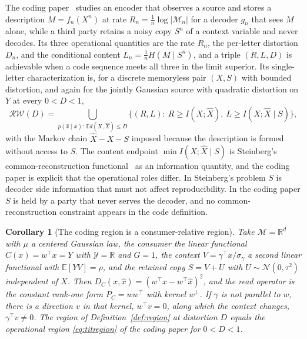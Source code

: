 \documentclass[11pt]{article}
\newtheorem{corollary}{Corollary}
\theoremstyle{definition}
\theoremstyle{remark}
\newcommand{\PC}{P_{C}}
\newcommand{\M}{\mathcal{M}}
\newcommand{\Y}{\mathcal{Y}}
\newcommand{\E}{\mathbb{E}}
\newcommand{\R}{\mathbb{R}}
\begin{document}
The coding paper~\cite{bond2026tit} studies an encoder that observes a source and stores a description $M=f_{n}(X^{n})$ at rate $R_{n}=\tfrac1n\log|\mathcal{M}_{n}|$ for a decoder $g_{n}$ that sees $M$ alone, while a third party retains a noisy copy $S^{n}$ of a context variable and never decodes.
Its three operational quantities are the rate $R_{n}$, the per-letter distortion $D_{n}$, and the conditional content $L_{n}=\tfrac1n H(M\mid S^{n})$, and a triple $(R,L,D)$ is achievable when a code sequence meets all three in the limit superior.
Its single-letter characterization is, for a discrete memoryless pair $(X,S)$ with bounded distortion, and again for the jointly Gaussian source with quadratic distortion on $Y$ at every $0<D<1$,
\begin{equation}
\mathcal{RW}(D)=\bigcup_{p(\hat{x}\mid x):\,\E d(X,\hat{X})\le D}\bigl\{(R,L):\ R\ge I(X;\hat{X}),\ L\ge I(X;\hat{X}\mid S)\bigr\},
\label{eq:titregion}
\end{equation}
with the Markov chain $\hat{X}-X-S$ imposed because the description is formed without access to $S$.
The content endpoint $\min I(X;\hat{X}\mid S)$ is Steinberg's common-reconstruction functional~\cite{steinberg2009} as an information quantity, and the coding paper is explicit that the operational roles differ. In Steinberg's problem $S$ is decoder side information that must not affect reproducibility. In the coding paper $S$ is held by a party that never serves the decoder, and no common-reconstruction constraint appears in the code definition.

\begin{corollary}[The coding region is a consumer-relative region]
\label{cor:coding}
Take $\M=\R^{d}$ with $\mu$ a centered Gaussian law, the consumer the linear functional $C(x)=w^{\top}x=Y$ with $\Y=\R$ and $G=1$, the context $V=\gamma^{\top}x/\sigma_{\gamma}$ a second linear functional with $\E[YV]=\rho$, and the retained copy $S=V+U$ with $U\sim\mathcal{N}(0,\tau^{2})$ independent of $X$. Then $D_{C}(x,\hat{x})=(w^{\top}x-w^{\top}\hat{x})^{2}$, and the read operator is the constant rank-one form $\PC=ww^{\top}$ with kernel $w^{\perp}$. If $\gamma$ is not parallel to $w$, there is a direction $v$ in that kernel, $w^{\top}v=0$, along which the context changes, $\gamma^{\top}v\ne0$. The region of Definition~\ref{def:region} at distortion $D$ equals the operational region \eqref{eq:titregion} of the coding paper for $0<D<1$.
\end{corollary}
\end{document}
